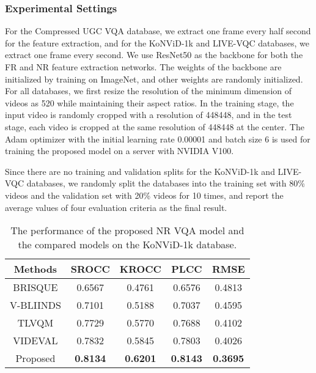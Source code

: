 \documentclass{article}
\begin{document}
\subsubsection{Experimental Settings}

For the Compressed UGC VQA database, we extract one frame every half second for the feature extraction, and for the KoNViD-1k and LIVE-VQC databases, we extract one frame every second. We use ResNet50 \cite{he2016deep} as the backbone for both the FR and NR feature extraction networks. The weights of the backbone are initialized by training on ImageNet, and other weights are randomly initialized. For all databases, we first resize the resolution of the minimum dimension of videos as 520 while maintaining their aspect ratios. In the training stage, the input video is randomly cropped with a resolution of 448448, and in the test stage, each video is cropped at the same resolution of 448448 at the center. The Adam optimizer with the initial learning rate 0.00001 and batch size 6 is used for training the proposed model on a server with NVIDIA V100.

Since there are no training and validation splits for the KoNViD-1k and LIVE-VQC databases, we randomly split the databases into the training set with 80\% videos and the validation set with 20\% videos for 10 times, and report the average values of four evaluation criteria as the final result.

\begin{table}
	\small
\centering
	\renewcommand{\arraystretch}{1.15}
	\caption{The performance of the proposed NR VQA model and the compared models on the KoNViD-1k database.}
	\label{NR_KoNViD-1k}
\begin{tabular}{c|cccc}
		\toprule[.15em]
		
		Methods & SROCC & KROCC & PLCC & RMSE   \\
		\hline
		
		BRISQUE \cite{mittal2012no}    &0.6567  &0.4761  & 0.6576  &0.4813  \\
		
		
		V-BLIINDS \cite{saad2014blind}  &0.7101  &0.5188  &0.7037&0.4595 \\
		
		TLVQM \cite{korhonen2019two} &0.7729  &0.5770  &0.7688 &0.4102   \\
		
		VIDEVAL \cite{tu2021ugc} &0.7832  &0.5845  &0.7803 &0.4026   \\
		
		
		Proposed    & \textbf{0.8134} 	&\textbf{ 0.6201} 	&\textbf{0.8143} 	&\textbf{0.3695} \\
		
		\bottomrule[.15em]
		
	\end{tabular}	
\vspace{-0.2cm}	
\end{table}
\end{document}
